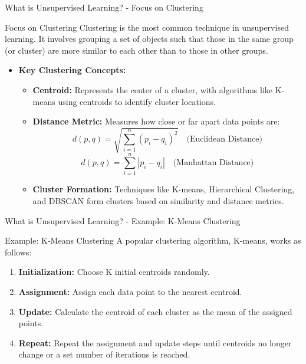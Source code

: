 \documentclass[aspectratio=169]{beamer}
\begin{document}
\begin{frame}[fragile]{What is Unsupervised Learning? - Focus on Clustering}
    \begin{block}{Focus on Clustering}
        Clustering is the most common technique in unsupervised learning. It involves grouping a set of objects such that those in the same group (or cluster) are more similar to each other than to those in other groups.
    \end{block}

    \begin{itemize}
        \item \textbf{Key Clustering Concepts:}
        \begin{itemize}
            \item \textbf{Centroid:} Represents the center of a cluster, with algorithms like K-means using centroids to identify cluster locations.
            \item \textbf{Distance Metric:} Measures how close or far apart data points are:
            \begin{equation}
                d(p, q) = \sqrt{\sum_{i=1}^{n} (p_i - q_i)^2} \quad \text{(Euclidean Distance)}
            \end{equation}
            \begin{equation}
                d(p, q) = \sum_{i=1}^{n} |p_i - q_i| \quad \text{(Manhattan Distance)}
            \end{equation}
            \item \textbf{Cluster Formation:} Techniques like K-means, Hierarchical Clustering, and DBSCAN form clusters based on similarity and distance metrics.
        \end{itemize}
    \end{itemize}
\end{frame}

\begin{frame}[fragile]{What is Unsupervised Learning? - Example: K-Means Clustering}
    \begin{block}{Example: K-Means Clustering}
        A popular clustering algorithm, K-means, works as follows:
    \end{block}
    \begin{enumerate}
        \item \textbf{Initialization:} Choose K initial centroids randomly.
        \item \textbf{Assignment:} Assign each data point to the nearest centroid.
        \item \textbf{Update:} Calculate the centroid of each cluster as the mean of the assigned points.
        \item \textbf{Repeat:} Repeat the assignment and update steps until centroids no longer change or a set number of iterations is reached.
    \end{enumerate}
\end{frame}
\end{document}
